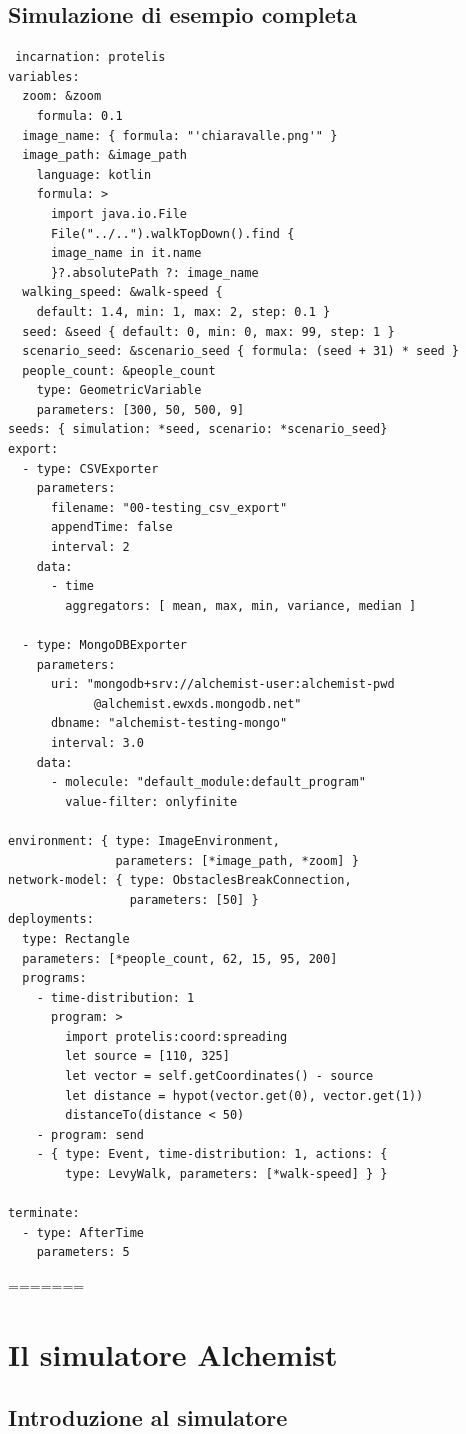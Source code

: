 \documentclass[12pt,a4paper,openright,oneside]{book}
\begin{document}
\section{Simulazione di esempio completa}
 \begin{verbatim}
 incarnation: protelis
variables:
  zoom: &zoom
    formula: 0.1
  image_name: { formula: "'chiaravalle.png'" }
  image_path: &image_path
    language: kotlin
    formula: >
      import java.io.File
      File("../..").walkTopDown().find { 
      image_name in it.name
      }?.absolutePath ?: image_name
  walking_speed: &walk-speed { 
    default: 1.4, min: 1, max: 2, step: 0.1 }
  seed: &seed { default: 0, min: 0, max: 99, step: 1 }
  scenario_seed: &scenario_seed { formula: (seed + 31) * seed }
  people_count: &people_count
    type: GeometricVariable
    parameters: [300, 50, 500, 9]
seeds: { simulation: *seed, scenario: *scenario_seed}
export:
  - type: CSVExporter
    parameters: 
      filename: "00-testing_csv_export"
      appendTime: false
      interval: 2
    data:
      - time
        aggregators: [ mean, max, min, variance, median ]

  - type: MongoDBExporter
    parameters:
      uri: "mongodb+srv://alchemist-user:alchemist-pwd
            @alchemist.ewxds.mongodb.net"
      dbname: "alchemist-testing-mongo"
      interval: 3.0
    data:
      - molecule: "default_module:default_program"
        value-filter: onlyfinite      
        
environment: { type: ImageEnvironment,
               parameters: [*image_path, *zoom] }
network-model: { type: ObstaclesBreakConnection,
                 parameters: [50] }
deployments:
  type: Rectangle
  parameters: [*people_count, 62, 15, 95, 200]
  programs:
    - time-distribution: 1
      program: >
        import protelis:coord:spreading
        let source = [110, 325]
        let vector = self.getCoordinates() - source
        let distance = hypot(vector.get(0), vector.get(1))
        distanceTo(distance < 50)
    - program: send
    - { type: Event, time-distribution: 1, actions: { 
        type: LevyWalk, parameters: [*walk-speed] } }

terminate:
  - type: AfterTime
    parameters: 5
\end{verbatim}
=======
\chapter{Il simulatore Alchemist}
\section{Introduzione al simulatore}
\end{document}

